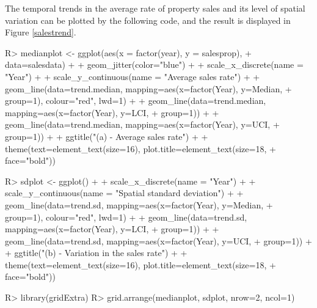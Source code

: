 \documentclass[article, nojss]{jss}
\begin{document}
The temporal trends in the average rate of property sales and its level of spatial variation can be plotted by the following code, and the result is displayed in Figure \ref{salestrend}.



\begin{CodeInput}
R>  medianplot <- ggplot(aes(x = factor(year), y = salesprop), 
+             data=salesdata) +
+         geom_jitter(color="blue") + 
+         scale_x_discrete(name = "Year") +
+         scale_y_continuous(name = "Average sales rate") + 
+         geom_line(data=trend.median, mapping=aes(x=factor(Year), y=Median, 
+             group=1), colour="red", lwd=1) + 
+         geom_line(data=trend.median, mapping=aes(x=factor(Year), y=LCI, 
+             group=1)) + 
+         geom_line(data=trend.median, mapping=aes(x=factor(Year), y=UCI, 
+             group=1)) + 
+         ggtitle("(a) - Average sales rate") +
+         theme(text=element_text(size=16), plot.title=element_text(size=18, 
+             face="bold")) 

R>  sdplot <- ggplot() +
+         scale_x_discrete(name = "Year") +
+         scale_y_continuous(name = "Spatial standard deviation") + 
+         geom_line(data=trend.sd, mapping=aes(x=factor(Year), y=Median, 
+             group=1), colour="red", lwd=1) + 
+         geom_line(data=trend.sd, mapping=aes(x=factor(Year), y=LCI, 
+             group=1)) + 
+         geom_line(data=trend.sd, mapping=aes(x=factor(Year), y=UCI, 
+             group=1)) + 
+         ggtitle("(b) - Variation in the sales rate") +
+         theme(text=element_text(size=16), plot.title=element_text(size=18, 
+             face="bold")) 

R>  library(gridExtra)
R>  grid.arrange(medianplot, sdplot, nrow=2, ncol=1)
\end{CodeInput}
\end{document}
